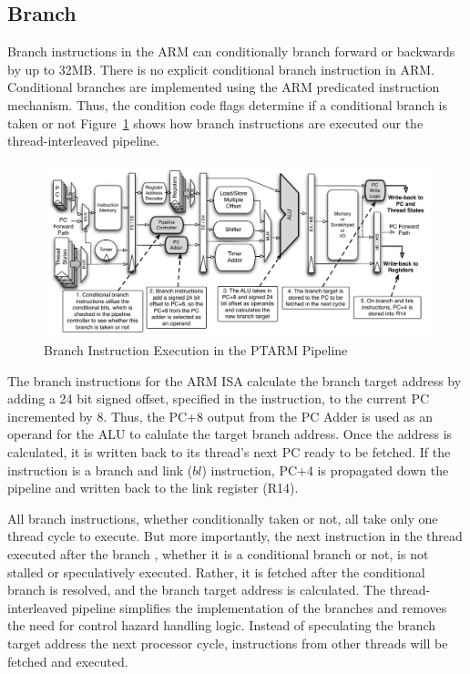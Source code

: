 \subsection{Branch}
Branch instructions in the ARM can conditionally branch forward or backwards by up to 32MB.
There is no explicit conditional branch instruction in ARM.
Conditional branches are implemented using the ARM predicated instruction mechanism.
Thus, the condition code flags determine if a conditional branch is taken or not 
Figure~\ref{fig:branch_pipeline_implementation} shows how branch instructions are executed our the thread-interleaved pipeline.

\begin{figure}[h]
  \vspace{-15pt}
  \begin{center}
    \includegraphics[scale=.54]{figs/branch_pipeline_implementation}
  \end{center}
  \vspace{-3mm}
  \caption{Branch Instruction Execution in the PTARM Pipeline}
  \label{fig:branch_pipeline_implementation}
\end{figure}

The branch instructions for the ARM ISA calculate the branch target address by adding a 24 bit signed offset, specified in the instruction, to the current PC incremented by 8. 
Thus, the PC+8 output from the PC Adder is used as an operand for the ALU to calulate the target branch address.  
Once the address is calculated, it is written back to its thread's next PC ready to be fetched. 
If the instruction is a branch and link ($bl$) instruction, PC+4 is propagated down the pipeline and written back to the link register (R14).   

All branch instructions, whether conditionally taken or not, all take only one thread cycle to execute.
But more importantly, the next instruction in the thread executed after the branch , whether it is a conditional branch or not, is not stalled or speculatively executed.
Rather, it is fetched after the conditional branch is resolved, and the branch target address is calculated. 
The thread-interleaved pipeline simplifies the implementation of the branches and removes the need for control hazard handling logic.
Instead of speculating the branch target address the next processor cycle, instructions from other threads will be fetched and executed.

